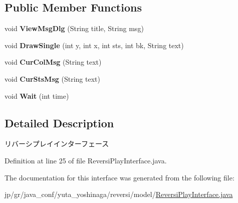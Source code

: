 \subsection*{Public Member Functions}
\begin{DoxyCompactItemize}
\item 
\mbox{\label{interfacejp_1_1gr_1_1java__conf_1_1yuta__yoshinaga_1_1reversi_1_1model_1_1_reversi_play_interface_ad18d82b1ba87e80bdb9191275297a7ee}} 
void {\bfseries View\+Msg\+Dlg} (String title, String msg)
\item 
\mbox{\label{interfacejp_1_1gr_1_1java__conf_1_1yuta__yoshinaga_1_1reversi_1_1model_1_1_reversi_play_interface_a3afe46bfc7c4d213f4ff337b59b412bb}} 
void {\bfseries Draw\+Single} (int y, int x, int sts, int bk, String text)
\item 
\mbox{\label{interfacejp_1_1gr_1_1java__conf_1_1yuta__yoshinaga_1_1reversi_1_1model_1_1_reversi_play_interface_a6e77a6933a85c2f7d5e1983ae705d33e}} 
void {\bfseries Cur\+Col\+Msg} (String text)
\item 
\mbox{\label{interfacejp_1_1gr_1_1java__conf_1_1yuta__yoshinaga_1_1reversi_1_1model_1_1_reversi_play_interface_ae4e363228aa513b929d592af1c63d774}} 
void {\bfseries Cur\+Sts\+Msg} (String text)
\item 
\mbox{\label{interfacejp_1_1gr_1_1java__conf_1_1yuta__yoshinaga_1_1reversi_1_1model_1_1_reversi_play_interface_a0af39ae1588a84c9caca420a00d88beb}} 
void {\bfseries Wait} (int time)
\end{DoxyCompactItemize}


\subsection{Detailed Description}
リバーシプレイインターフェース 

Definition at line 25 of file Reversi\+Play\+Interface.\+java.



The documentation for this interface was generated from the following file\+:\begin{DoxyCompactItemize}
\item 
jp/gr/java\+\_\+conf/yuta\+\_\+yoshinaga/reversi/model/\hyperlink{_reversi_play_interface_8java}{Reversi\+Play\+Interface.\+java}\end{DoxyCompactItemize}
